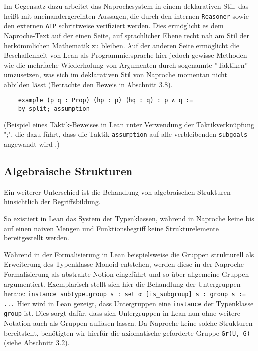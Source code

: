 \documentclass[a4paper,12pt]{scrartcl}
\newcommand{\ls}[1]{\lstinline|#1|}
\begin{document}
\lstset{language=ftl}
\begin{lstlisting}
\end{lstlisting}

Im Gegensatz dazu arbeitet das Naprochesystem in einem deklarativen Stil, das heißt mit aneinandergereihten Aussagen, die durch den internen \verb!Reasoner! sowie den externen \verb!ATP! schrittweise verifiziert werden. Dies ermöglicht es dem Naproche-Text auf der einen Seite, auf sprachlicher Ebene recht nah am Stil der herkömmlichen Mathematik zu bleiben. Auf der anderen Seite ermöglicht die Beschaffenheit von Lean als Programmiersprache hier jedoch gewisse Methoden wie die mehrfache Wiederholung von Argumenten durch sogenannte ''Taktiken'' umzusetzen, was sich im deklarativen Stil von Naproche momentan nicht abbilden lässt (Betrachte den Beweis in Abschnitt 3.8).

\lstset{language=lean}
\begin{lstlisting}
    example (p q : Prop) (hp : p) (hq : q) : p ∧ q :=
    by split; assumption
\end{lstlisting}

(Beispiel eines Taktik-Beweises in Lean unter Verwendung der Taktikverknüpfung ";", die dazu führt, dass die Taktik \lstinline{assumption} auf alle verbleibenden \lstinline{subgoals} angewandt wird \cite{bibtex.e}.)

\subsection{Algebraische Strukturen}

Ein weiterer Unterschied ist die Behandlung von algebraischen Strukturen hinsichtlich der Begriffsbildung.

So existiert in Lean das System der Typenklassen, während in Naproche keine bis auf einen naiven Mengen und Funktionsbegriff keine Strukturelemente bereitgestellt werden.

Während in der Formalisierung in Lean beispielsweise die Gruppen strukturell als Erweiterung des Typenklasse Monoid entstehen, werden diese in der Naproche-Formalisierung als abstrakte Notion eingeführt und so über allgemeine Gruppen argumentiert. Exemplarisch stellt sich hier die Behandlung der Untergruppen heraus:
\lstinline{instance subtype.group s : set α [is_subgroup] s : group s := ...} Hier wird in Lean gezeigt, dass Untergruppen eine \ls{instance} der Typenklasse \ls{group} ist. Dies sorgt dafür, dass sich Untergruppen in Lean nun ohne weitere Notation auch als Gruppen auffasen lassen.
Da Naproche keine solche Strukturen bereitstellt, benötigten wir hierfür die axiomatische geforderte Gruppe \verb!Gr(U, G)! (siehe Abschnitt 3.2).
\end{document}
